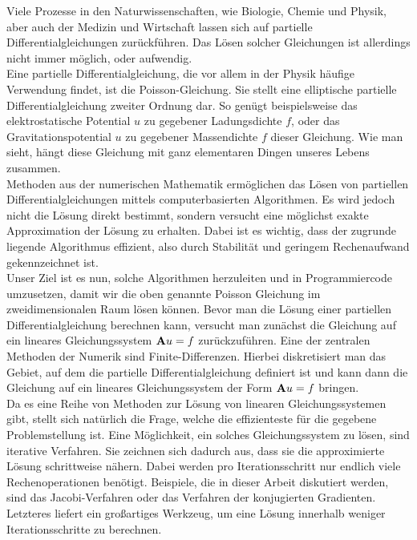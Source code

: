Viele Prozesse in den Naturwissenschaften, wie Biologie, Chemie und Physik, aber auch der Medizin und Wirtschaft lassen sich auf partielle Differentialgleichungen zurückführen. Das Lösen solcher Gleichungen ist allerdings nicht immer möglich, oder aufwendig. \\
Eine partielle Differentialgleichung, die vor allem in der Physik häufige Verwendung findet, ist die Poisson-Gleichung. Sie stellt eine elliptische partielle Differentialgleichung zweiter Ordnung dar. So genügt beispielsweise das elektrostatische Potential $u$ zu gegebener Ladungsdichte $f$, oder das Gravitationspotential $u$ zu gegebener Massendichte $f$ dieser Gleichung. Wie man sieht, hängt diese Gleichung mit ganz elementaren Dingen unseres Lebens zusammen. \\
Methoden aus der numerischen Mathematik ermöglichen das Lösen von partiellen\\ Differentialgleichungen mittels computerbasierten Algorithmen. Es wird jedoch nicht die Lösung direkt bestimmt, sondern versucht eine möglichst exakte Approximation der Lösung zu erhalten. Dabei ist es wichtig, dass der zugrunde liegende Algorithmus effizient, also durch Stabilität und geringem Rechenaufwand gekennzeichnet ist. \\
Unser Ziel ist es nun, solche Algorithmen herzuleiten und in Programmiercode umzusetzen, damit wir die oben genannte Poisson Gleichung im zweidimensionalen Raum lösen können. Bevor man die Lösung einer partiellen Differentialgleichung berechnen kann, versucht man zunächst die Gleichung auf ein lineares Gleichungssystem ${\textbf{A}} u = f$ zurückzuführen. Eine der zentralen Methoden der Numerik sind Finite-Differenzen. Hierbei diskretisiert man das Gebiet, auf dem die partielle Differentialgleichung definiert ist und kann dann die Gleichung auf ein lineares Gleichungssystem der Form ${\textbf{A}} u = f$ bringen. \\
Da es eine Reihe von Methoden zur Lösung von linearen Gleichungssystemen gibt, stellt sich natürlich die Frage, welche die effizienteste für die gegebene Problemstellung ist. Eine Möglichkeit, ein solches Gleichungssystem zu lösen, sind iterative Verfahren. Sie zeichnen sich dadurch aus, dass sie die approximierte Lösung schrittweise nähern. Dabei werden pro Iterationsschritt nur endlich viele Rechenoperationen benötigt. Beispiele, die in dieser Arbeit diskutiert werden, sind das Jacobi-Verfahren oder das Verfahren der konjugierten Gradienten. Letzteres liefert ein großartiges Werkzeug, um eine Lösung innerhalb weniger Iterationsschritte zu berechnen. \\
